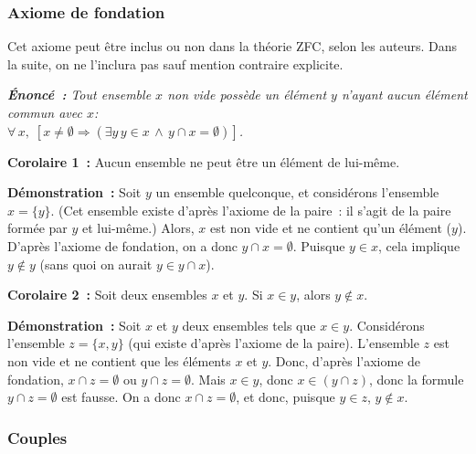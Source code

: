 \subsubsection{Axiome de fondation} 

Cet axiome peut être inclus ou non dans la théorie ZFC, selon les auteurs. 
Dans la suite, on ne l'inclura pas sauf mention contraire explicite.

\medskip

\noindent\textit{\textbf{Énoncé :} Tout ensemble $x$ non vide possède un élément $y$ n'ayant aucun élément commun avec $x$: \\
$\forall \, x, \; \left[ x \neq \emptyset \Rightarrow (\exists y \, y \in x \, \wedge \, y \cap x = \emptyset) \right]$.} 

\medskip

\noindent\textbf{Corolaire 1 :} Aucun ensemble ne peut être un élément de lui-même. 

\medskip

\noindent\textbf{Démonstration :} Soit $y$ un ensemble quelconque, et considérons l'ensemble $x = \lbrace y \rbrace$. 
(Cet ensemble existe d'après l'axiome de la paire : il s'agit de la paire formée par $y$ et lui-même.)
Alors, $x$ est non vide et ne contient qu'un élément ($y$). 
D'après l'axiome de fondation, on a donc $y \cap x = \emptyset$. 
Puisque $y \in x$, cela implique $y \notin y$ (sans quoi on aurait $y \in y \cap x$). 

\done

\medskip

\noindent\textbf{Corolaire 2 :} Soit deux ensembles $x$ et $y$. Si $x \in y$, alors $y \notin x$. 

\medskip

\noindent\textbf{Démonstration :} Soit $x$ et $y$ deux ensembles tels que $x \in y$. 
Considérons l'ensemble $z = \lbrace x,y  \rbrace$ (qui existe d'après l'axiome de la paire). 
L'ensemble $z$ est non vide et ne contient que les éléments $x$ et $y$. 
Donc, d'après l'axiome de fondation, $x \cap z = \emptyset$ ou $y \cap z = \emptyset$. 
Mais $x \in y$, donc $x \in (y \cap z)$, donc la formule $y \cap z = \emptyset$ est fausse. 
On a donc $x \cap z = \emptyset$, et donc, puisque $y \in z$, $y \notin x$. 

\done

\subsubsection{Couples} 

